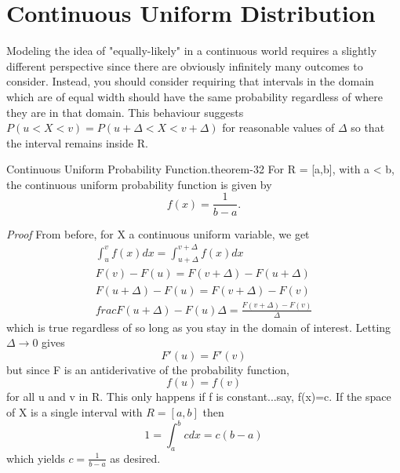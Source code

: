\documentclass[10pt,]{book}
\makeatletter
\renewcommand*{\proofname}{Proof}
\renewenvironment{proof}[1][\proofname]{\par
  \pushQED{\qed}%
  \normalfont \topsep6\p@\@plus6\p@\relax
  \trivlist
  \item\relax
    {\itshape
    #1\@addpunct{.}}\hspace\labelsep\ignorespaces
}{%
  \popQED\endtrivlist\@endpefalse
}
\numberwithin{equation}{section}
\newcommand{\lt}{<}
\makeatother
\begin{document}
\section[{Continuous Uniform Distribution}]{Continuous Uniform Distribution}\label{section-41}
\hypertarget{p-809}{}%
Modeling the idea of "equally-likely" in a continuous world requires a slightly different perspective since there are obviously infinitely many outcomes to consider. Instead, you should consider requiring that intervals in the domain which are of equal width should have the same probability regardless of where they are in that domain. This behaviour suggests \(P(u \lt X \lt v) = P(u + \Delta \lt X \lt v + \Delta)\) for reasonable values of \(\Delta\) so that the interval remains inside R.%
\par
\hypertarget{p-810}{}%
\begin{theorem}{Continuous Uniform Probability Function.}{}{theorem-32}%
\hypertarget{ContinuousUniformFunction}{}%
For R = [a,b], with a < b, the continuous uniform probability function is given by%
\begin{equation*}
f(x) = \frac{1}{b-a}.
\end{equation*}
%
\end{theorem}
\begin{proof}\hypertarget{proof-35}{}
\hypertarget{p-812}{}%
From before, for X a continuous uniform variable, we get%
\begin{gather*}
\int_u^v f(x) dx = \int_{u+\Delta}^{v+\Delta} f(x) dx\\
F(v)-F(u) = F(v+\Delta)-F(u+\Delta)\\
F(u+\Delta)-F(u) = F(v+\Delta)-F(v)\\
frac{F(u+\Delta)-F(u)}{\Delta} = \frac{F(v+\Delta)-F(v)}{\Delta}
\end{gather*}
which is true regardless of \Delta so long as you stay in the domain of interest. Letting \(\Delta \rightarrow 0\) gives%
\begin{equation*}
F'(u) = F'(v)
\end{equation*}
but since F is an antiderivative of the probability function,%
\begin{equation*}
f(u) = f(v)
\end{equation*}
for all u and v in R. This only happens if f is constant...say, f(x)=c. If the space of X is a single interval with \(R = [a,b]\) then%
\begin{equation*}
1 = \int_a^b c dx = c(b-a)
\end{equation*}
which yields \(c = \frac{1}{b-a}\) as desired.%
\end{proof}
\end{document}
